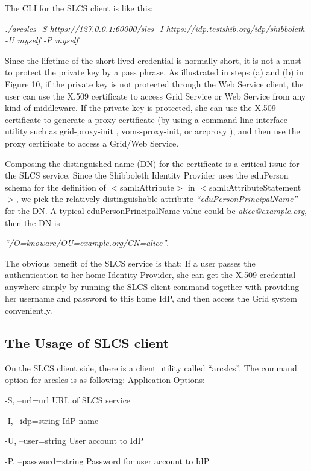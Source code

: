 \documentclass{article}                            %
\begin{document}
The CLI for the SLCS client is like this:

\textit{./arcslcs -S https://127.0.0.1:60000/slcs -I https://idp.testshib.org/idp/shibboleth -U myself -P myself}

    Since the lifetime of the short lived credential is normally short, it is not a must to protect the private key by a pass phrase. As illustrated in steps (a) and (b) in Figure 10, if the private key is not protected through the Web Service client, the user can use the X.509 certificate to access Grid Service or Web Service from any kind of middleware. If the private key is protected, she can use the X.509 certificate to generate a proxy certificate (by using a command-line interface utility such as grid-proxy-init , voms-proxy-init, or arcproxy ), and then use the proxy certificate to access a Grid/Web Service.

    Composing the distinguished name (DN) for the certificate is a critical issue for the SLCS service. Since the Shibboleth Identity Provider uses the eduPerson schema for the definition of $<$saml:Attribute$>$ in $<$saml:AttributeStatement$>$, we pick the relatively distinguishable attribute \textit{``eduPersonPrincipalName''} for the DN. A typical eduPersonPrincipalName value could be \textit{alice@example.org}, then the DN is 

\textit{``/O=knowarc/OU=example.org/CN=alice''}.

    The obvious benefit of the SLCS service is that: If a user passes the authentication to her home Identity Provider, she can get the X.509 credential anywhere simply by running the SLCS client command together with providing her username and password to this home IdP, and then access the Grid system conveniently.

\subsection{The Usage of SLCS client} %
\label{subsec:slcs_client}

    On the SLCS client side, there is a client utility called ``arcslcs''.  The command option for arcslcs is as following:
Application Options: 

  -S, --url=url                URL of SLCS service 

  -I, --idp=string             IdP name 

  -U, --user=string            User account to IdP 

  -P, --password=string        Password for user account to IdP 
\end{document}
